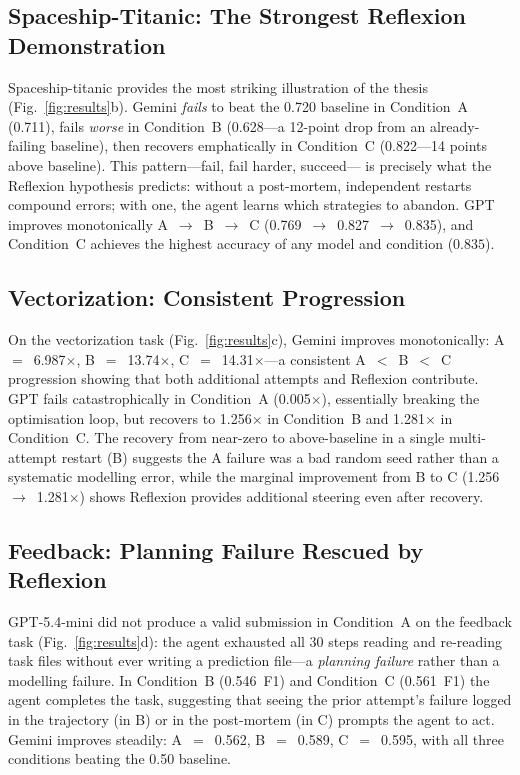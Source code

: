 \documentclass[conference]{IEEEtran}
\begin{document}
\subsection{Spaceship-Titanic: The Strongest Reflexion Demonstration}

Spaceship-titanic provides the most striking illustration of the thesis
(Fig.~\ref{fig:results}b). Gemini \emph{fails} to beat the 0.720 baseline in
Condition~A (0.711), fails \emph{worse} in Condition~B (0.628---a 12-point drop
from an already-failing baseline), then recovers emphatically in Condition~C
(0.822---14 points above baseline). This pattern---fail, fail harder, succeed---
is precisely what the Reflexion hypothesis predicts: without a post-mortem,
independent restarts compound errors; with one, the agent learns which
strategies to abandon. GPT improves monotonically A~$\to$~B~$\to$~C
(0.769~$\to$~0.827~$\to$~0.835), and Condition~C achieves the highest accuracy
of any model and condition ($0.835$).

\subsection{Vectorization: Consistent Progression}

On the vectorization task (Fig.~\ref{fig:results}c), Gemini improves
monotonically: A~$=$~6.987$\times$, B~$=$~13.74$\times$,
C~$=$~14.31$\times$---a consistent A~$<$~B~$<$~C progression showing that both
additional attempts and Reflexion contribute. GPT fails catastrophically in
Condition~A (0.005$\times$), essentially breaking the optimisation loop, but
recovers to 1.256$\times$ in Condition~B and 1.281$\times$ in Condition~C.
The recovery from near-zero to above-baseline in a single multi-attempt
restart (B) suggests the A failure was a bad random seed rather than a
systematic modelling error, while the marginal improvement from B to C
(1.256~$\to$~1.281$\times$) shows Reflexion provides additional steering even
after recovery.

\subsection{Feedback: Planning Failure Rescued by Reflexion}

GPT-5.4-mini did not produce a valid submission in Condition~A on the feedback
task (Fig.~\ref{fig:results}d): the agent exhausted all 30 steps reading and
re-reading task files without ever writing a prediction file---a \emph{planning
failure} rather than a modelling failure. In Condition~B (0.546~F1) and
Condition~C (0.561~F1) the agent completes the task, suggesting that seeing the
prior attempt's failure logged in the trajectory (in B) or in the post-mortem
(in C) prompts the agent to act. Gemini improves steadily:
A~$=$~0.562, B~$=$~0.589, C~$=$~0.595, with all three conditions beating the
0.50 baseline.
\end{document}
